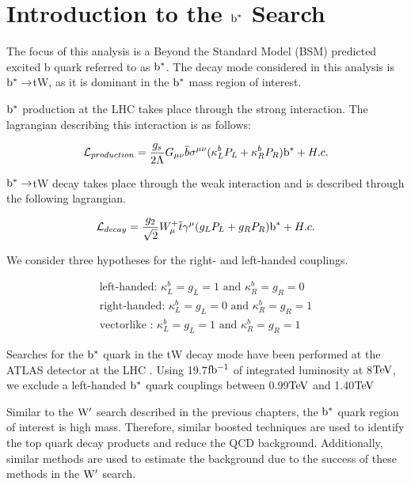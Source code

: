 \chapter{Introduction to the $\mathrm{b}^{*}$ Search}
\label{sec:bsintroduction}

The focus of this analysis is a Beyond the Standard Model (BSM) predicted \cite{Tait:2000sh} excited b quark referred to as $\mathrm{b}^{*}$.  
The decay mode considered in this analysis is $\mathrm{b}^{*} \to $tW, as it is dominant in the $\mathrm{b}^{*}$ mass region of interest.

$\mathrm{b}^{*}$ production at the LHC takes place through the strong interaction.  The lagrangian describing this interaction is as follows: 

\begin{eqnarray}
{\cal L}_{production} = \frac{g_s}{2\Lambda}G_{\mu\nu} \overline{b} \sigma^{\mu\nu} (\kappa^{b}_{L}P_L + \kappa^{b}_{R}P_R)\bs + H.c.
\label{eqn:Lag1}
\end{eqnarray}

$\mathrm{b}^{*} \to $tW decay takes place through the weak interaction and is described through the following lagrangian. 

\begin{eqnarray}
{\cal L}_{decay} = \frac{g_2}{\sqrt{2}}W^{+}_{\mu} \overline{t} \gamma^{\mu}(g_{L}P_L + g_{R}P_R)\bs + H.c.
\label{eqn:Lag2}
\end{eqnarray}

We consider three hypotheses for the right- and left-handed couplings.

\begin{eqnarray}
\text{left-handed: }\kappa^{b}_{L}=g_{L}=1 \text{ and } \kappa^{b}_{R}=g_{R}=0 \\
\text{right-handed: }\kappa^{b}_{L}=g_{L}=0 \text{ and } \kappa^{b}_{R}=g_{R}=1 \\
\text{vectorlike : }\kappa^{b}_{L}=g_{L}=1 \text{ and } \kappa^{b}_{R}=g_{R}=1 
\label{eqn:couplings}
\end{eqnarray}

Searches for the $\mathrm{b}^{*}$ quark in the tW decay mode have been performed at the ATLAS detector at the LHC \cite{Aad:2013rna}.  
Using 19.7$\mathrm{fb^{-1}}$ of integrated luminosity at 8$\mathrm{TeV}$, we exclude a left-handed $\mathrm{b}^{*}$ quark couplings between 0.99$\mathrm{TeV}$ and 1.40$\mathrm{TeV}$  

Similar to the $\mathrm{W}^{\prime}$ search described in the previous chapters, the $\mathrm{b}^{*}$ quark region of interest is high mass.  
Therefore, similar boosted techniques are used to identify the top quark decay products and reduce the QCD background.  
Additionally, similar methods are used to estimate the background due to the success of these methods in the $\mathrm{W}^{\prime}$ search.  


